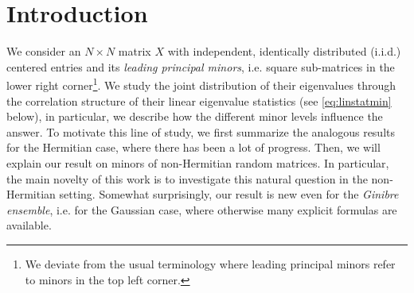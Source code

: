 \documentclass[10pt]{amsart}
\numberwithin{equation}{section}
\begin{document}


\section{Introduction}

We consider an $N\times N$ matrix $X$ with independent, identically distributed (i.i.d.) centered entries and its 
\emph{leading principal  minors}, i.e. square sub-matrices in the lower right corner\footnote{We deviate from the usual terminology where leading principal minors refer to minors in the top left corner.}. We study the joint distribution of their eigenvalues through the correlation structure of their linear eigenvalue statistics (see \eqref{eq:linstatmin} below), in particular, we describe how the different minor levels influence the answer. To motivate this line of study, we first summarize the analogous results for the Hermitian case, where there has been a lot of progress. Then, we will explain our result on minors of non-Hermitian random matrices. In particular, the main novelty of this work is to investigate this natural question in the non-Hermitian setting. Somewhat surprisingly, our result is new even for the \emph{Ginibre ensemble}, i.e. for the Gaussian case, where otherwise many explicit formulas are available.
\end{document}
